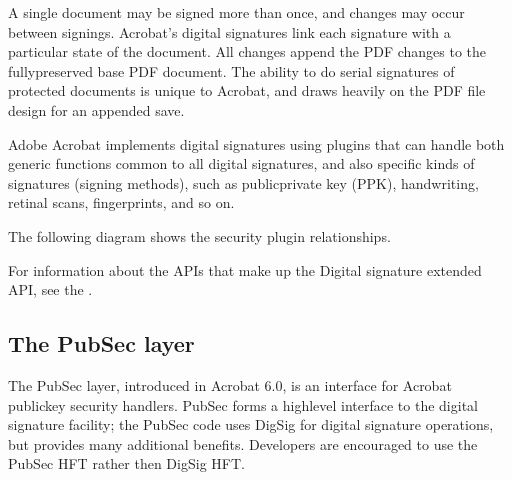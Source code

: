 \documentclass[letterpaper,12pt,english,openany,oneside]{sphinxmanual}
\begin{document}
A single document may be signed more than once, and changes may occur between signings. Acrobat’s digital signatures link each signature with a particular state of the document. All changes append the PDF changes to the fully\sphinxhyphen{}preserved base PDF document. The ability to do serial signatures of protected documents is unique to Acrobat, and draws heavily on the PDF file design for an appended save.

Adobe Acrobat implements digital signatures using plugins that can handle both generic functions common to all digital signatures, and also specific kinds of signatures (signing methods), such as public\sphinxhyphen{}private key (PPK), handwriting, retinal scans, fingerprints, and so on.

The following diagram shows the security plugin relationships.

\noindent{}

For information about the APIs that make up the Digital signature extended API, see the .


\subsection{The PubSec layer}
\label{\detokenize{Plugins_ExtendedAPI:the-pubsec-layer}}
The PubSec layer, introduced in Acrobat 6.0, is an interface for Acrobat public\sphinxhyphen{}key security handlers. PubSec forms a high\sphinxhyphen{}level interface to the digital signature facility; the PubSec code uses DigSig for digital signature operations, but provides many additional benefits. Developers are encouraged to use the PubSec HFT rather then DigSig HFT.
\end{document}
